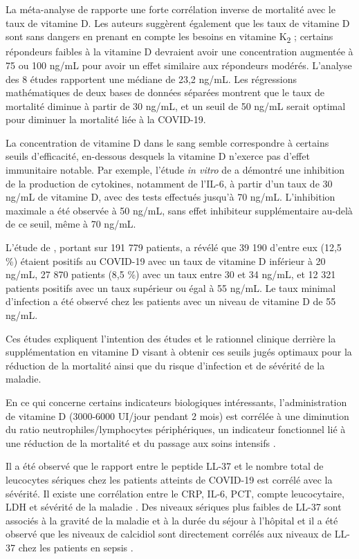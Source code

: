 \documentclass[
  a4paper,
  DIV=11,
  numbers=noendperiod,
  listof=totoc]{scrreprt}
\begin{document}
La méta-analyse de \textcite{Borsche.2021} rapporte une forte
corrélation inverse de mortalité avec le taux de vitamine D. Les auteurs
suggèrent également que les taux de vitamine D sont sans dangers en
prenant en compte les besoins en vitamine K\textsubscript{2} ; certains
répondeurs faibles à la vitamine D devraient avoir une concentration
augmentée à 75 ou 100 ng/mL pour avoir un effet similaire aux répondeurs
modérés. L'analyse des 8 études rapportent une médiane de 23,2 ng/mL.
Les régressions mathématiques de deux bases de données séparées montrent
que le taux de mortalité diminue à partir de 30 ng/mL, et un seuil de 50
ng/mL serait optimal pour diminuer la mortalité liée à la COVID-19.

La concentration de vitamine D dans le sang semble correspondre à
certains seuils d'efficacité, en-dessous desquels la vitamine D n'exerce
pas d'effet immunitaire notable. Par exemple, l'étude \emph{in vitro} de
\textcite{Zhang.2012} a démontré une inhibition de la production de
cytokines, notamment de l'\ac{IL-6}, à partir d'un taux de 30 ng/mL de
vitamine D, avec des tests effectués jusqu'à 70 ng/mL. L'inhibition
maximale a été observée à 50 ng/mL, sans effet inhibiteur supplémentaire
au-delà de ce seuil, même à 70 ng/mL.

L'étude de \textcite{Kaufman.2020}, portant sur 191 779 patients, a
révélé que 39 190 d'entre eux (12,5 \%) étaient positifs au COVID-19
avec un taux de vitamine D inférieur à 20 ng/mL, 27 870 patients (8,5
\%) avec un taux entre 30 et 34 ng/mL, et 12 321 patients positifs avec
un taux supérieur ou égal à 55 ng/mL. Le taux minimal d'infection a été
observé chez les patients avec un niveau de vitamine D de 55 ng/mL.

Ces études expliquent l'intention des études et le rationnel clinique
derrière la supplémentation en vitamine D visant à obtenir ces seuils
jugés optimaux pour la réduction de la mortalité ainsi que du risque
d'infection et de sévérité de la maladie.

En ce qui concerne certains indicateurs biologiques intéressants,
l'administration de vitamine D (3000-6000 UI/jour pendant 2 mois) est
corrélée à une diminution du ratio neutrophiles/lymphocytes
périphériques, un indicateur fonctionnel lié à une réduction de la
mortalité et du passage aux soins intensifs \autocite{Maghbooli.2021}.

Il a été observé que le rapport entre le peptide LL-37 et le nombre
total de leucocytes sériques chez les patients atteints de COVID-19 est
corrélé avec la sévérité. Il existe une corrélation entre le \ac{CRP},
\ac{IL-6}, \ac{PCT}, compte leucocytaire, \ac{LDH} et sévérité de la
maladie \autocite{Keutmann.2022}. Des niveaux sériques plus faibles de
LL-37 sont associés à la gravité de la maladie et à la durée du séjour à
l'hôpital \autocite{Keutmann.2022} et il a été observé que les niveaux
de calcidiol sont directement corrélés aux niveaux de LL-37 chez les
patients en sepsis \autocite{Cutuli.2024}.
\end{document}
